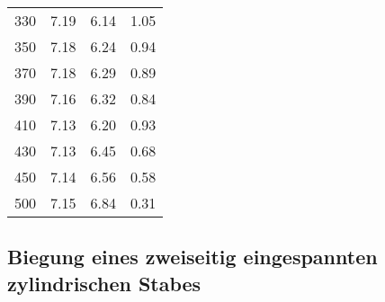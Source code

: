 \begin{table}
{\begin{tabular}[t]{c c c c}
        330 & 7.19 & 6.14 & 1.05\\
        350 & 7.18 & 6.24 & 0.94\\
        370 & 7.18 & 6.29 & 0.89\\
        390 & 7.16 & 6.32 & 0.84\\
        410 & 7.13 & 6.20 & 0.93\\
        430 & 7.13 & 6.45 & 0.68\\
        450 & 7.14 & 6.56 & 0.58\\
        500 & 7.15 & 6.84 & 0.31\\
            \bottomrule
    \end{tabular}
    }
\end{table}

\subsection{Biegung eines zweiseitig eingespannten zylindrischen Stabes}

